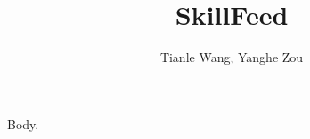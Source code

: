 \documentclass{article}
\title{SkillFeed}
\author{Tianle Wang\equalcontrib, Yanghe Zou\equalcontrib}
\begin{document}
\maketitle
Body.
\end{document}
